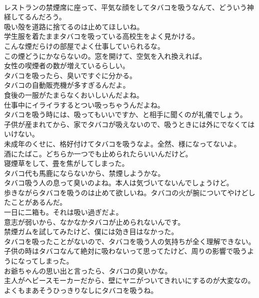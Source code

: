 \documentclass[8pt]{extreport}
\begin{document}
\begin{CJK}{UTF8}{min}
\\	レストランの禁煙席に座って、平気な顔をしてタバコを吸うなんて、どういう神経してるんだろう。	
\\	吸い殻を道路に捨てるのは止めてほしいね。	
\\	学生服を着たままタバコを吸っている高校生をよく見かける。	
\\	こんな煙だらけの部屋でよく仕事していられるな。	
\\	この煙どうにかならないの。窓を開けて、空気を入れ換えれば。	
\\	女性の喫煙者の数が増えているらしい。	
\\	タバコを吸ったら、臭いですぐに分かる。	
\\	タバコの自動販売機が多すぎるんだよ。	
\\	食後の一服がたまらなくおいしいんだよね。	
\\	仕事中にイライラするとつい吸っちゃうんだよね。	
\\	タバコを吸う時には、吸ってもいいですか、と相手に聞くのが礼儀でしょう。	
\\	子供が産まれてから、家でタバコが吸えないので、吸うときには外にでなくてはいけない。	
\\	未成年のくせに、格好付けてタバコを吸うなよ。全然、様になってないよ。	
\\	酒にたばこ。どちらか一つでも止められたらいいんだけど。	
\\	寝煙草をして、畳を焦がしてしまった。	
\\	タバコ代も馬鹿にならないから、禁煙しようかな。	
\\	タバコ吸う人の息って臭いのよね。本人は気づいてないんでしょうけど。	
\\	歩きながらタバコを吸うのは止めて欲しいね。タバコの火が腕についてやけどしたことがあるんだ。	
\\	一日に二箱も。それは吸い過ぎだよ。	
\\	意志が弱いから、なかなかタバコが止められないんです。	
\\	禁煙ガムを試してみたけど、僕には効き目はなかった。	
\\	タバコを吸ったことがないので、タバコを吸う人の気持ちが全く理解できない。	
\\	子供の時はタバコなんて絶対に吸わないって思ってたけど、周りの影響で吸うようになってしまった。	
\\	お爺ちゃんの思い出と言ったら、タバコの臭いかな。	
\\	主人がヘビースモーカーだから、壁にヤニがついてきれいにするのが大変なの。	
\\	よくもまあそうひっきりなしにタバコを吸うね。	

\end{CJK}
\end{document}
